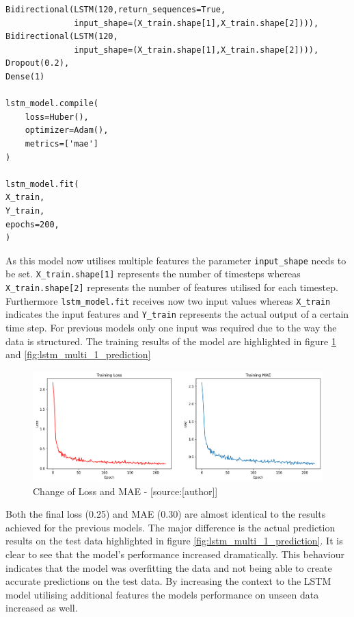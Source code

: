 \begin{lstlisting}
Bidirectional(LSTM(120,return_sequences=True,
              input_shape=(X_train.shape[1],X_train.shape[2]))),
Bidirectional(LSTM(120,
              input_shape=(X_train.shape[1],X_train.shape[2]))),
Dropout(0.2),
Dense(1)

lstm_model.compile(
    loss=Huber(),
    optimizer=Adam(),
    metrics=['mae']
)

lstm_model.fit(
X_train, 
Y_train, 
epochs=200, 
)
\end{lstlisting}
As this model now utilises multiple features the parameter \verb|input_shape| needs to be set.  \verb|X_train.shape[1]| represents the number of timesteps whereas \verb|X_train.shape[2]| represents the number of features utilised for each timestep. Furthermore \verb|lstm_model.fit| receives now two input values whereas \verb|X_train| indicates the input features and \verb|Y_train| represents the actual output of a certain time step. For previous models only one input was required due to the way the data is structured. 
The training results of the model are highlighted in figure \ref{fig:lstm_multi_1_mae} and \ref{fig:lstm_multi_1_prediction} 
\begin{figure}[H]
	\centering
		\includegraphics[width=12cm]{images/lstm_multi_1_mae}
	\caption{Change of Loss and MAE - [source:[author]]}
	\label{fig:lstm_multi_1_mae}
\end{figure}
Both the final loss (0.25) and MAE (0.30) are almost identical to the results achieved for the previous models. The major difference is the actual prediction results on the test data highlighted in figure \ref{fig:lstm_multi_1_prediction}. It is clear to see that the model's performance increased dramatically. This behaviour indicates that the model was overfitting the data and not being able to create accurate predictions on the test data. By increasing the context to the LSTM model utilising additional features the models performance on unseen data increased as well. 
